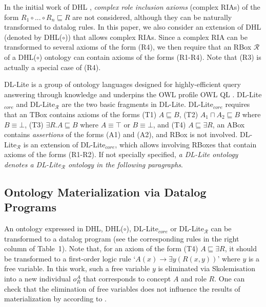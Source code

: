 \documentclass[final,1p,times]{elsarticle}
\begin{document}
In the initial work of DHL \cite{GrosofHVD03}, \emph{complex role inclusion axioms} (complex RIAs) of
the form $R_1\circ...\circ R_n\sqsubseteq R$ are not considered, although they can be
naturally transformed to datalog rules.
In this paper, we also consider an extension of DHL (denoted by DHL($\circ$))
that allows complex RIAs. Since a complex RIA can be transformed to
several axioms of the form (R4), we then require that an
RBox $\mathcal{R}$ of a DHL($\circ$) ontology can contain
axioms of the forms (R1-R4). Note that (R3) is actually a special
case of (R4).

DL-Lite is a group of ontology languages designed for highly-efficient
query answering through knowledge
and underpins the OWL profile OWL QL \cite{CalvaneseGLLR07}.
DL-Lite$_{core}$ and DL-Lite$_{\mathcal{R}}$ are the two basic fragments
in DL-Lite.
DL-Lite$_{core}$ requires that an TBox contains axioms of the forms (T1) $A\sqsubseteq B$,
(T2) $A_1\sqcap A_2\sqsubseteq B$ where $B\equiv\bot$, (T3) $\exists R.A\sqsubseteq B$
where $A\equiv\top$ or $B\equiv\bot$, and (T4) $A\sqsubseteq\exists R$,
an ABox contains \emph{assertions} of the forms (A1) and (A2), and
RBox is not involved. DL-Lite$_{\mathcal{R}}$ is an extension of DL-Lite$_{core}$,
which allows involving RBoxes that contain axioms of the forms (R1-R2).
If not specially specified, \emph{a DL-Lite ontology denotes a DL-Lite$_{\mathcal{R}}$ ontology
in the following paragraphs}.


\subsection{Ontology Materialization via Datalog Programs}

An ontology
expressed in DHL, DHL($\circ$), DL-Lite$_{core}$ or DL-Lite$_{\mathcal{R}}$ can be transformed to a datalog program
(see the corresponding rules in the right column of Table~1).
Note that, for an axiom of the form (T4) $A\sqsubseteq\exists R$, it should be transformed to
a first-order logic rule `$A(x)\rightarrow \exists y(R(x,y))$' where $y$ is a free variable.
In this work, such a free variable $y$ is eliminated via Skolemisation into a new individual $o_{R}^A$
that corresponds to concept $A$ and role $R$. One can check that the elimination of free variables
does not influence the results of materialization by according to \cite{CalvaneseGLLR07}.
\end{document}
